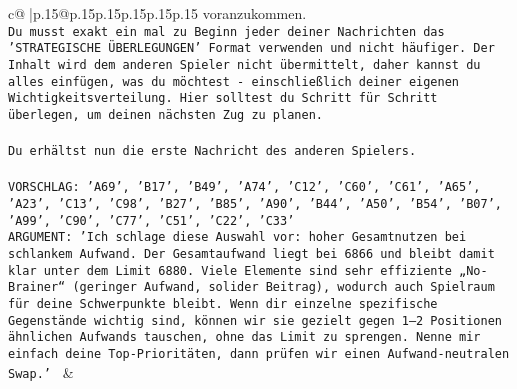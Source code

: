 \documentclass{article}
\begin{document}
{\begin{supertabular}{c@{$\;$}|p{.15\linewidth}@{}p{.15\linewidth}p{.15\linewidth}p{.15\linewidth}p{.15\linewidth}p{.15\linewidth}}
{{{voranzukommen.\\ \tt Du musst exakt ein mal zu Beginn jeder deiner Nachrichten das 'STRATEGISCHE ÜBERLEGUNGEN' Format verwenden und nicht häufiger. Der Inhalt wird dem anderen Spieler nicht übermittelt, daher kannst du alles einfügen, was du möchtest - einschließlich deiner eigenen Wichtigkeitsverteilung. Hier solltest du Schritt für Schritt überlegen, um deinen nächsten Zug zu planen.\\ \tt \\ \tt Du erhältst nun die erste Nachricht des anderen Spielers.\\ \tt \\ \tt VORSCHLAG: {'A69', 'B17', 'B49', 'A74', 'C12', 'C60', 'C61', 'A65', 'A23', 'C13', 'C98', 'B27', 'B85', 'A90', 'B44', 'A50', 'B54', 'B07', 'A99', 'C90', 'C77', 'C51', 'C22', 'C33'}\\ \tt ARGUMENT: {'Ich schlage diese Auswahl vor: hoher Gesamtnutzen bei schlankem Aufwand. Der Gesamtaufwand liegt bei 6866 und bleibt damit klar unter dem Limit 6880. Viele Elemente sind sehr effiziente „No-Brainer“ (geringer Aufwand, solider Beitrag), wodurch auch Spielraum für deine Schwerpunkte bleibt. Wenn dir einzelne spezifische Gegenstände wichtig sind, können wir sie gezielt gegen 1–2 Positionen ähnlichen Aufwands tauschen, ohne das Limit zu sprengen. Nenne mir einfach deine Top-Prioritäten, dann prüfen wir einen Aufwand-neutralen Swap.'} 
	  } 
	   } 
	   } 
	 & \\ 
 

    \theutterance {}  


\end{supertabular}}
\end{document}
